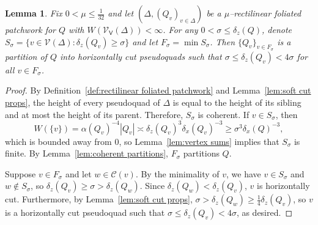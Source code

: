 \documentclass[11pt,reqno]{amsart}
\newcommand{\cC}{\mathcal{C}}
\newcommand{\cV}{\mathcal{V}}
\renewcommand{\approx}{\asymp}
\newcommand{\0}{\mathbf{0}}
\renewcommand{\1}{\mathbf 1}
\renewcommand{\mid}{:}
\renewcommand{\ge}{\geqslant}
\renewcommand{\le}{\leqslant}
\newtheorem{lemma}[thm]{Lemma}
\theoremstyle{remark}
\newcommand{\cVv}{{\mathcal{V}_{\mathsf{V}}}}
\begin{document}
\begin{lemma}\label{lem:hcut partitions}
  Fix $0<\mu\le \frac{1}{32}$ and let $(\Delta,(Q_v)_{v\in \Delta})$ be a $\mu$--rectilinear foliated patchwork for $Q$ with $W(\cVv(\Delta))<\infty$.  For any $0<\sigma\le \delta_z(Q)$, denote
  $S_\sigma=\{v\in \cV(\Delta)\mid \delta_z(Q_v)\ge \sigma\}$
  and let $F_\sigma=\min S_\sigma$.  Then $\{Q_v\}_{v\in F_\sigma}$ is a partition of $Q$ into horizontally cut pseudoquads such that $\sigma \le \delta_z(Q_v)<4\sigma$ for all $v\in F_\sigma$.
\end{lemma}


\begin{proof}
  By Definition~\ref{def:rectilinear foliated patchwork} and Lemma~\ref{lem:soft cut props}, the height of every pseudoquad of $\Delta$ is equal to the height of its sibling and at most the height of its parent.  Therefore, $S_\sigma$ is coherent.  If $v\in S_\sigma$, then
  $$W(\{v\})=\alpha(Q_v)^{-4}|Q_v|\approx \delta_z(Q_v)^3 \delta_x(Q_v)^{-3}\ge \sigma^{3} \delta_x(Q)^{-3},$$
  which is bounded away from $0$, so Lemma~\ref{lem:vertex sums} implies that $S_\sigma$ is finite.  By Lemma~\ref{lem:coherent partitions}, $F_\sigma$ partitions $Q$.

  Suppose $v\in F_\sigma$ and let $w\in \cC(v)$.  By the minimality of $v$, we have $v\in S_\sigma$ and $w\not\in S_\sigma$, so $\delta_z(Q_v)\ge \sigma>\delta_z(Q_w)$.  Since $\delta_z(Q_w)<\delta_z(Q_v)$, $v$ is horizontally cut.  Furthermore, by Lemma~\ref{lem:soft cut props}, $\sigma>\delta_z(Q_w)\ge \frac{1}{4}\delta_z(Q_v)$, so $v$ is a horizontally cut pseudoquad such that $\sigma \le \delta_z(Q_v)<4\sigma$, as desired.
\end{proof}
\end{document}
